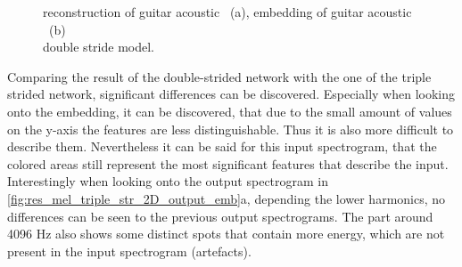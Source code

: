 \begin{figure}[htb!]
    \centering
    \captionsetup{justification=centering}
    \caption{reconstruction of guitar acoustic ~(a), embedding of guitar acoustic ~(b)\\double stride model.}
    \label{fig:res_mel_double_str_2D_output_emb}
\end{figure}

Comparing the result of the double-strided network with the one of the triple strided network, significant differences can be discovered. Especially when looking onto the embedding, it can be discovered, that due to the small amount of values on the y-axis the features are less distinguishable. Thus it is also more difficult to describe them. Nevertheless it can be said for this input spectrogram, that the colored areas still represent the most significant features that describe the input. Interestingly when looking onto the output spectrogram in \ref{fig:res_mel_triple_str_2D_output_emb}a, depending the lower harmonics, no differences can be seen to the previous output spectrograms. The part around 4096 Hz also shows some distinct spots that contain more energy, which are not present in the input spectrogram (artefacts).

